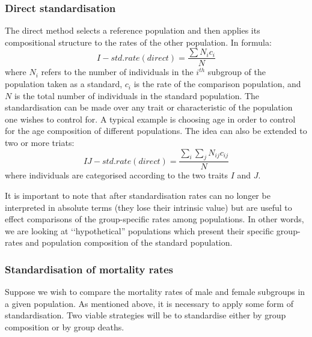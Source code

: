 \documentclass[../main.tex]{subfiles}
\begin{document}
\subsubsection{Direct standardisation}

The direct method selects a reference population and then applies its compositional structure to the rates of the other population. In formula:
\begin{equation}
    I- std. rate (direct) = \frac{\sum N_i c_i}{N}
\end{equation}
where $N_i$ refers to the number of individuals in the $i^{th}$ subgroup of the population taken as a standard, $c_i$ is the rate of the comparison population, and $N$ is the total number of individuals in the standard population.
The standardisation can be made over any trait or characteristic of the population one wishes to control for. A typical example is choosing age in order to control for the age composition of different populations. The idea can also be extended to two or more triats:
\begin{equation}
    IJ -  std. rate (direct) = \frac{\sum_{i}\sum_{j} N_{ij} c_{ij}}{N}
\end{equation}
where individuals are categorised according to the two traits $I$ and $J$.

It is important to note that after standardisation rates can no longer be interpreted in absolute terms (they lose their intrinsic value) but are useful to effect comparisons of the group-specific rates among  populations. In other words, we are looking at \lq\lq hypothetical'' populations which present their specific group-rates and population composition of the standard population. 


\subsubsection{Standardisation of mortality rates}

Suppose we wish to compare the mortality rates of male and female subgroups in a given population. As mentioned above, it is necessary to apply some form of standardisation. Two viable strategies will be to standardise either by group composition or by group deaths.
\end{document}
